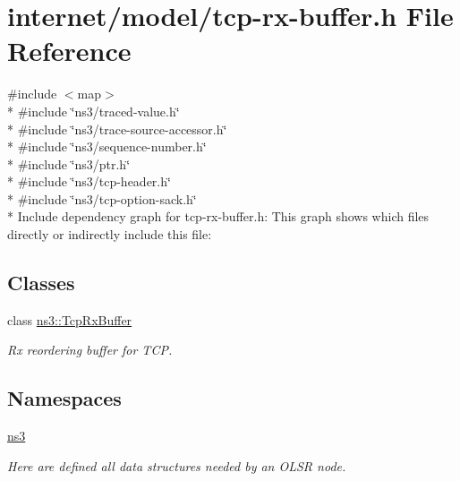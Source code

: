 \hypertarget{tcp-rx-buffer_8h}{}\section{internet/model/tcp-\/rx-\/buffer.h File Reference}
\label{tcp-rx-buffer_8h}
{\ttfamily \#include $<$map$>$}\\*
{\ttfamily \#include \char`\"{}ns3/traced-\/value.\+h\char`\"{}}\\*
{\ttfamily \#include \char`\"{}ns3/trace-\/source-\/accessor.\+h\char`\"{}}\\*
{\ttfamily \#include \char`\"{}ns3/sequence-\/number.\+h\char`\"{}}\\*
{\ttfamily \#include \char`\"{}ns3/ptr.\+h\char`\"{}}\\*
{\ttfamily \#include \char`\"{}ns3/tcp-\/header.\+h\char`\"{}}\\*
{\ttfamily \#include \char`\"{}ns3/tcp-\/option-\/sack.\+h\char`\"{}}\\*
Include dependency graph for tcp-\/rx-\/buffer.h\+:
This graph shows which files directly or indirectly include this file\+:
\subsection*{Classes}
\begin{DoxyCompactItemize}
\item 
class \hyperlink{classns3_1_1TcpRxBuffer}{ns3\+::\+Tcp\+Rx\+Buffer}
\begin{DoxyCompactList}\small\item\em Rx reordering buffer for T\+CP. \end{DoxyCompactList}\end{DoxyCompactItemize}
\subsection*{Namespaces}
\begin{DoxyCompactItemize}
\item 
 \hyperlink{namespacens3}{ns3}
\begin{DoxyCompactList}\small\item\em Here are defined all data structures needed by an O\+L\+SR node. \end{DoxyCompactList}\end{DoxyCompactItemize}
